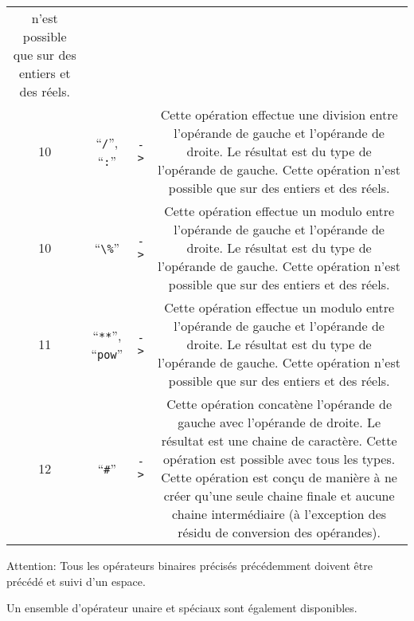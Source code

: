 \documentclass[a5paper, 12pt]{book}
\begin{document}
\begin{tabular}{c|c|c|c}
  n'est possible que sur des entiers et des réels.\\
  10 & ``\verb!/!'', ``\verb!:!'' & \verb!->! &
  Cette opération effectue une division entre l'opérande de gauche et l'opérande
  de droite. Le résultat est du type de l'opérande de gauche. Cette opération
  n'est possible que sur des entiers et des réels.\\
  10 & ``\verb!\%!'' & \verb!->! &
  Cette opération effectue un modulo entre l'opérande de gauche et l'opérande
  de droite. Le résultat est du type de l'opérande de gauche. Cette opération
  n'est possible que sur des entiers et des réels.\\
  \hline
  11 & ``\verb!**!'', ``\verb!pow!'' & \verb!->! &
  Cette opération effectue un modulo entre l'opérande de gauche et l'opérande
  de droite. Le résultat est du type de l'opérande de gauche. Cette opération
  n'est possible que sur des entiers et des réels.\\
  \hline
  12 & ``\verb!#!'' & \verb!->! &
  Cette opération concatène l'opérande de gauche avec l'opérande de droite.
  Le résultat est une chaine de caractère. Cette opération est possible
  avec tous les types.
  Cette opération est conçu de manière à ne créer qu'une seule chaine
  finale et aucune chaine intermédiaire (à l'exception des résidu de
  conversion des opérandes).\\
  \hline
\end{tabular}

Attention: Tous les opérateurs binaires précisés précédemment doivent être
précédé et suivi d'un espace.

Un ensemble d'opérateur unaire et spéciaux sont également disponibles.
\end{document}

